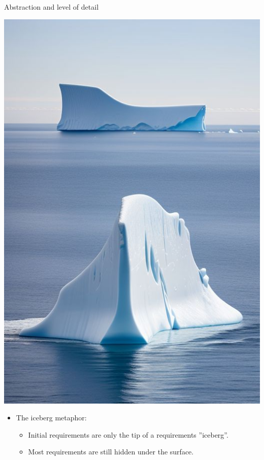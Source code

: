 \begin{Slide}{Abstraction and level of detail}

\begin{minipage}[t]{0.4\textwidth}
\vspace{-1.0em}\includegraphics[width=1.0\textwidth]{../img/iceberg4}
\end{minipage}%
\begin{minipage}[t]{0.6\textwidth}
\begin{itemize}
\item The iceberg metaphor: 
\begin{itemize}
\item Initial requirements are only the tip of a requirements ''iceberg''.
\item Most requirements are still hidden under the surface.

\end{itemize}
\end{itemize}
\end{minipage}
\end{Slide}
